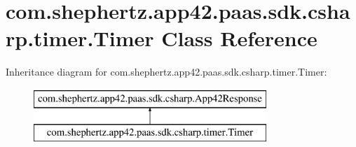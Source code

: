 \hypertarget{classcom_1_1shephertz_1_1app42_1_1paas_1_1sdk_1_1csharp_1_1timer_1_1_timer}{\section{com.\+shephertz.\+app42.\+paas.\+sdk.\+csharp.\+timer.\+Timer Class Reference}
\label{classcom_1_1shephertz_1_1app42_1_1paas_1_1sdk_1_1csharp_1_1timer_1_1_timer}
}
Inheritance diagram for com.\+shephertz.\+app42.\+paas.\+sdk.\+csharp.\+timer.\+Timer\+:\begin{figure}[H]
\begin{center}
\leavevmode
\includegraphics[height=2.000000cm]{classcom_1_1shephertz_1_1app42_1_1paas_1_1sdk_1_1csharp_1_1timer_1_1_timer}
\end{center}
\end{figure}
